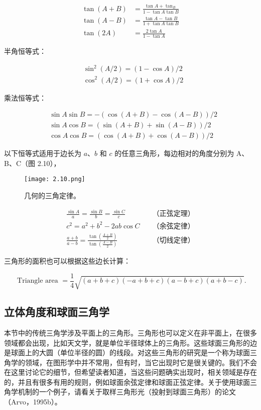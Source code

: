 \documentclass[lang=cn,12pt]{elegantbook}
\begin{document}
$$
\begin{aligned}
\tan (A+B) &=\frac{\tan A+\tan _{B}}{1-\tan A \tan B} \\
\tan (A-B) &=\frac{\tan A-\tan B}{1+\tan A \tan B} \\
\tan (2 A) &=\frac{2 \tan A}{1  -\tan A}
\end{aligned}
$$

半角恒等式：

$$
\begin{aligned}
&\sin ^{2}(A / 2)=(1-\cos A) / 2 \\
&\cos ^{2}(A / 2)=(1+\cos A) / 2
\end{aligned}
$$

乘法恒等式：

$$
\begin{aligned}
&\sin A \sin B=-(\cos (A+B)-\cos (A-B)) / 2 \\
&\sin A \cos B=(\sin (A+B)+\sin (A-B)) / 2 \\
&\cos A \cos B=(\cos (A+B)+\cos (A-B)) / 2
\end{aligned}
$$

以下恒等式适用于边长为 $a$、$b$ 和 $c$ 的任意三角形，每边相对的角度分别为 A、B、C（图 2.10），

\begin{figure}[htbp]
\centering
\texttt{[image: 2.10.png]}
\caption{几何的三角定律。}
\end{figure}

$$
\begin{aligned}
\frac{\sin A}{a}=\frac{\sin B}{b}=\frac{\sin C}{c}\quad &\mbox{（正弦定理）}\\
c^{2}=a^{2}+b^{2}-2 a b \cos C\quad &\mbox{（余弦定律）}\\
\frac{a+b}{a-b}=\frac{\tan \left(\frac{A+B}{2}\right)}{\tan \left(\frac{A-B}{2}\right)}\quad &\mbox{（切线定律）}
\end{aligned}
$$

三角形的面积也可以根据这些边长计算：

$$
\text { Triangle area }=\frac{1}{4} \sqrt{(a+b+c)(-a+b+c)(a-b+c)(a+b-c)} .
$$

\subsection{立体角度和球面三角学}

本节中的传统三角学涉及平面上的三角形。三角形也可以定义在非平面上，在很多领域都会出现，比如天文学，就是单位半径球体上的三角形。这些球面三角形的边是球面上的大圆（单位半径的圆）的线段。对这些三角形的研究是一个称为球面三角学的领域，在图形学中并不常用，但有时，当它出现时它是很关键的。我们不会在这里讨论它的细节，但希望读者知道，当这些问题确实出现时，相关领域是存在的，并且有很多有用的规则，例如球面余弦定律和球面正弦定律。关于使用球面三角学机制的一个例子，请看关于取样三角形光（投射到球面三角形）的论文（Arvo，1995b）。
\end{document}
